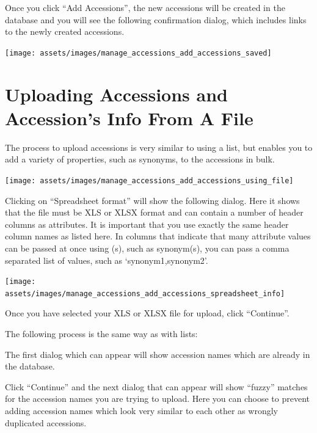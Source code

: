 \documentclass[
  12pt,
]{book}
\begin{document}
Once you click ``Add Accessions'', the new accessions will be created in the database and you will see the following confirmation dialog, which includes links to the newly created accessions.

\begin{center}\texttt{[image: assets/images/manage\_accessions\_add\_accessions\_saved]} \end{center}

\hypertarget{uploading-accessions-and-accessions-info-from-a-file}{%
\section{Uploading Accessions and Accession's Info From A File}\label{uploading-accessions-and-accessions-info-from-a-file}}

The process to upload accessions is very similar to using a list, but enables you to add a variety of properties, such as synonyms, to the accessions in bulk.

\begin{center}\texttt{[image: assets/images/manage\_accessions\_add\_accessions\_using\_file]} \end{center}

Clicking on ``Spreadsheet format'' will show the following dialog. Here it shows that the file must be XLS or XLSX format and can contain a number of header columns as attributes. It is important that you use exactly the same header column names as listed here. In columns that indicate that many attribute values can be passed at once using (s), such as synonym(s), you can pass a comma separated list of values, such as `synonym1,synonym2'.

\begin{center}\texttt{[image: assets/images/manage\_accessions\_add\_accessions\_spreadsheet\_info]} \end{center}

Once you have selected your XLS or XLSX file for upload, click ``Continue''.

The following process is the same way as with lists:

The first dialog which can appear will show accession names which are already in the database.

Click ``Continue'' and the next dialog that can appear will show ``fuzzy'' matches for the accession names you are trying to upload. Here you can choose to prevent adding accession names which look very similar to each other as wrongly duplicated accessions.
\end{document}
